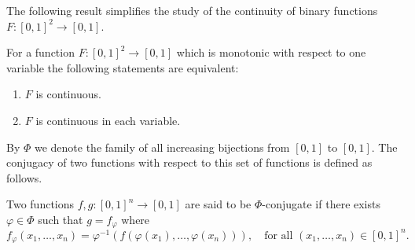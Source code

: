The following result simplifies the study of the continuity of binary functions $F:[0,1]^2 \to [0,1]$.

\begin{theorem}\label{theorem:A04}
	For a function $F:[0,1]^2 \to [0,1]$ which is monotonic with respect to one variable the following statements are equivalent:
	\begin{enumerate}[label=(\roman*)]
		\item $F$ is continuous.
		\item $F$ is continuous in each variable.
	\end{enumerate}
\end{theorem}

By $\Phi$ we denote the family of all increasing bijections from $[0,1]$ to $[0,1]$. The conjugacy of two functions with respect to this set of functions is defined as follows.
\begin{definition}
Two functions $f,g: [0,1]^n \to [0,1]$ are said to be $\Phi$-conjugate if there exists $\varphi \in \Phi$ such that $g=f_{\varphi}$ where
$$f_{\varphi}(x_1,\dots,x_n) = \varphi^{-1}(f(\varphi(x_1),\dots,\varphi(x_n))), \quad \text{for all } (x_1,\dots,x_n) \in [0,1]^n.$$
\end{definition}

